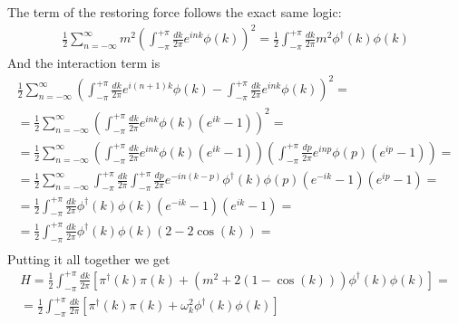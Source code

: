 \documentclass{article}
\begin{document}
The term of the restoring force follows the exact same logic:
\begin{equation}
\begin{gathered}
    \frac{1}{2}
    \sum_{n=-\infty}^{\infty}
    m^2\left(\int_{-\pi}^{+\pi} \frac{dk}{2\pi}e^{ink}\phi(k)\right)^2
    = \frac{1}{2}
    \int_{-\pi}^{+\pi} \frac{dk}{2\pi}
    m^2\phi^\dagger(k)\phi(k)
\end{gathered}
\end{equation}
And the interaction term is
\begin{equation}
\begin{gathered}
    \frac{1}{2}
    \sum_{n=-\infty}^{\infty}
    \left(
        \int_{-\pi}^{+\pi} \frac{dk}{2\pi}e^{i(n + 1)k}\phi(k) -
        \int_{-\pi}^{+\pi} \frac{dk}{2\pi}e^{ink}\phi(k)
    \right)^2 = \\
    = \frac{1}{2}
    \sum_{n=-\infty}^{\infty}
    \left(
        \int_{-\pi}^{+\pi} \frac{dk}{2\pi}e^{ink}\phi(k) (e^{ik} - 1)
    \right)^2 = \\
    = \frac{1}{2}
    \sum_{n=-\infty}^{\infty}
    \left(
        \int_{-\pi}^{+\pi} \frac{dk}{2\pi}e^{ink}\phi(k) (e^{ik} - 1)
    \right)
    \left(
        \int_{-\pi}^{+\pi} \frac{dp}{2\pi}e^{inp}\phi(p) (e^{ip} - 1)
    \right) = \\
    = \frac{1}{2}
    \sum_{n=-\infty}^{\infty}
        \int_{-\pi}^{+\pi} \frac{dk}{2\pi}\int_{-\pi}^{+\pi} \frac{dp}{2\pi}
        e^{-in(k - p)}\phi^\dagger(k)\phi(p)
        (e^{-ik} - 1)(e^{ip} - 1)
    = \\
    = \frac{1}{2}
        \int_{-\pi}^{+\pi} \frac{dk}{2\pi}
        \phi^\dagger(k)\phi(k)
        (e^{-ik} - 1)(e^{ik} - 1)
    = \\
    = \frac{1}{2}
        \int_{-\pi}^{+\pi} \frac{dk}{2\pi}
        \phi^\dagger(k)\phi(k)
        (2 - 2\cos(k))
    = \\
\end{gathered}
\end{equation}
Putting it all together we get
\begin{equation}
\begin{gathered}
    H = \frac{1}{2}
    \int_{-\pi}^{+\pi} \frac{dk}{2\pi}
    \left[
        \pi^\dagger(k)\pi(k) + 
        \left(
            m^2 + 2(1-\cos(k))
        \right)
        \phi^\dagger(k)\phi(k)
    \right] = \\
    = \frac{1}{2}
    \int_{-\pi}^{+\pi} \frac{dk}{2\pi}
    \left[
        \pi^\dagger(k)\pi(k) + 
        \omega_k^2
        \phi^\dagger(k)\phi(k)
    \right]
\end{gathered}
\end{equation}
\end{document}
